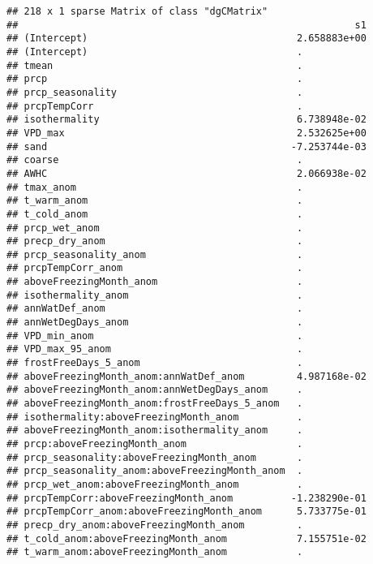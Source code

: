 \documentclass[
]{article}
\begin{document}
\begin{verbatim}
## 218 x 1 sparse Matrix of class "dgCMatrix"
##                                                          s1
## (Intercept)                                    2.658883e+00
## (Intercept)                                    .           
## tmean                                          .           
## prcp                                           .           
## prcp_seasonality                               .           
## prcpTempCorr                                   .           
## isothermality                                  6.738948e-02
## VPD_max                                        2.532625e+00
## sand                                          -7.253744e-03
## coarse                                         .           
## AWHC                                           2.066938e-02
## tmax_anom                                      .           
## t_warm_anom                                    .           
## t_cold_anom                                    .           
## prcp_wet_anom                                  .           
## precp_dry_anom                                 .           
## prcp_seasonality_anom                          .           
## prcpTempCorr_anom                              .           
## aboveFreezingMonth_anom                        .           
## isothermality_anom                             .           
## annWatDef_anom                                 .           
## annWetDegDays_anom                             .           
## VPD_min_anom                                   .           
## VPD_max_95_anom                                .           
## frostFreeDays_5_anom                           .           
## aboveFreezingMonth_anom:annWatDef_anom         4.987168e-02
## aboveFreezingMonth_anom:annWetDegDays_anom     .           
## aboveFreezingMonth_anom:frostFreeDays_5_anom   .           
## isothermality:aboveFreezingMonth_anom          .           
## aboveFreezingMonth_anom:isothermality_anom     .           
## prcp:aboveFreezingMonth_anom                   .           
## prcp_seasonality:aboveFreezingMonth_anom       .           
## prcp_seasonality_anom:aboveFreezingMonth_anom  .           
## prcp_wet_anom:aboveFreezingMonth_anom          .           
## prcpTempCorr:aboveFreezingMonth_anom          -1.238290e-01
## prcpTempCorr_anom:aboveFreezingMonth_anom      5.733775e-01
## precp_dry_anom:aboveFreezingMonth_anom         .           
## t_cold_anom:aboveFreezingMonth_anom            7.155751e-02
## t_warm_anom:aboveFreezingMonth_anom            .           

\end{verbatim}
\end{document}
